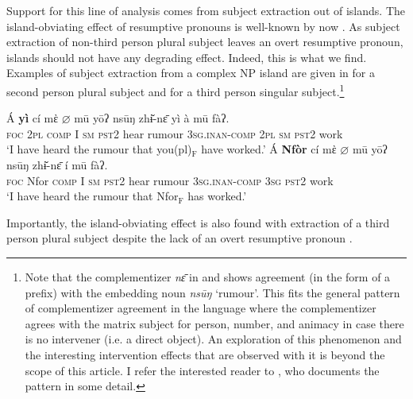 \documentclass[output=paper]{langscibook}
\begin{document}
Support for this line of analysis comes from subject extraction out of
islands. The island-obviating effect of resumptive pronouns is
well-known by now \citep{mcCloskey79,borer84}. As subject extraction of non-third
person plural subject leaves an overt resumptive pronoun, islands
should not have any degrading effect. Indeed, this is what we find. Examples of subject extraction from a complex NP island are given in
 for a second person plural subject and  for a third
person singular subject.\footnote{Note that the complementizer \textit{nɛ̄} in  and  shows agreement (in the form of a prefix) with the embedding noun \textit{nsūŋ} `rumour'. This fits the general pattern of complementizer agreement in the language where the complementizer agrees with the matrix subject for person, number, and animacy in case there is no intervener (i.e. a direct object). An exploration of this phenomenon and the interesting intervention effects that are observed with it is beyond the scope of this article. I refer the interested reader to \citet{nformi18}, who documents the pattern in some detail.}

\ea\label{ex:johanneshein:islandextraction}
\begin{xlist}
\ex \label{ex:johanneshein:islandextraction-a}
\gll Á \textbf{yì} cí mὲ $\varnothing$ mū yōʔ nsūŋ zhɨ̌-nɛ̄ yì à mū fàʔ.\\
\textsc{foc} \textsc{2pl} \textsc{comp} I \textsc{sm} \textsc{pst2} hear rumour \textsc{3sg.inan-comp} \textsc{2pl} \textsc{sm} \textsc{pst2} work\\
\glt `I have heard the rumour that you(pl)$_{\text{F}}$ have worked.'
\ex \label{ex:johanneshein:islandextraction-b}
\gll Á \textbf{Nfòr} cí mὲ $\varnothing$ mū yōʔ nsūŋ zhɨ̌-nɛ̄ í mū fàʔ.\\
\textsc{foc} Nfor \textsc{comp} I \textsc{sm} \textsc{pst2} hear rumour \textsc{3sg.inan-comp} \textsc{3sg} \textsc{pst2} work\\
\glt `I have heard the rumour that Nfor$_{\text{F}}$ has worked.'
\end{xlist}
\z
Importantly, the island-obviating effect is also found with extraction
of a third person plural subject despite the lack of an overt
resumptive pronoun .
\end{document}
